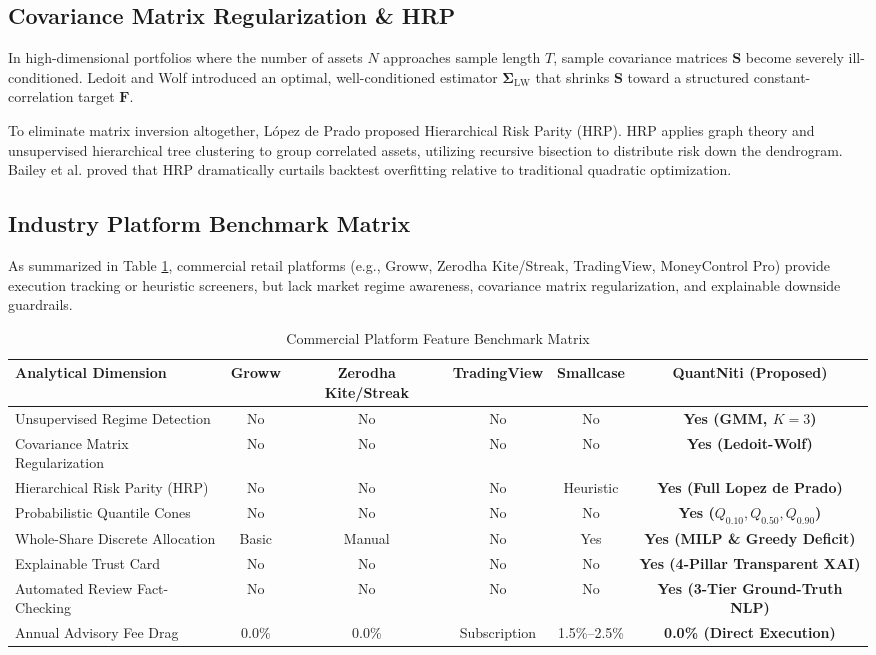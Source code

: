 \documentclass[conference]{IEEEtran}
\begin{document}
\subsection{Covariance Matrix Regularization \& HRP}
In high-dimensional portfolios where the number of assets $N$ approaches sample length $T$, sample covariance matrices $\mathbf{S}$ become severely ill-conditioned. Ledoit and Wolf \cite{ledoit2004well} introduced an optimal, well-conditioned estimator $\mathbf{\Sigma}_{\text{LW}}$ that shrinks $\mathbf{S}$ toward a structured constant-correlation target $\mathbf{F}$. 

To eliminate matrix inversion altogether, L{\'o}pez de Prado \cite{lopez2016building} proposed Hierarchical Risk Parity (HRP). HRP applies graph theory and unsupervised hierarchical tree clustering to group correlated assets, utilizing recursive bisection to distribute risk down the dendrogram. Bailey et al. \cite{bailey2014backtest} proved that HRP dramatically curtails backtest overfitting relative to traditional quadratic optimization.

\subsection{Industry Platform Benchmark Matrix}
As summarized in Table \ref{tab:competitors}, commercial retail platforms (e.g., Groww, Zerodha Kite/Streak, TradingView, MoneyControl Pro) provide execution tracking or heuristic screeners, but lack market regime awareness, covariance matrix regularization, and explainable downside guardrails.

\begin{table}[t]
\caption{Commercial Platform Feature Benchmark Matrix}
\label{tab:competitors}
\centering
\footnotesize
\setlength{\tabcolsep}{8pt}
\begin{tabular}{lccccc}
\toprule
\textbf{Analytical Dimension} & \textbf{Groww} & \textbf{Zerodha Kite/Streak} & \textbf{TradingView} & \textbf{Smallcase} & \textbf{QuantNiti (Proposed)} \\
\midrule
Unsupervised Regime Detection & No & No & No & No & \textbf{Yes (GMM, $K=3$)} \\
Covariance Matrix Regularization & No & No & No & No & \textbf{Yes (Ledoit-Wolf)} \\
Hierarchical Risk Parity (HRP) & No & No & No & Heuristic & \textbf{Yes (Full Lopez de Prado)} \\
Probabilistic Quantile Cones & No & No & No & No & \textbf{Yes ($Q_{0.10}, Q_{0.50}, Q_{0.90}$)} \\
Whole-Share Discrete Allocation & Basic & Manual & No & Yes & \textbf{Yes (MILP \& Greedy Deficit)} \\
Explainable Trust Card & No & No & No & No & \textbf{Yes (4-Pillar Transparent XAI)} \\
Automated Review Fact-Checking & No & No & No & No & \textbf{Yes (3-Tier Ground-Truth NLP)} \\
Annual Advisory Fee Drag & 0.0\% & 0.0\% & Subscription & 1.5\%--2.5\% & \textbf{0.0\% (Direct Execution)} \\
\bottomrule
\end{tabular}
\end{table}
\end{document}
